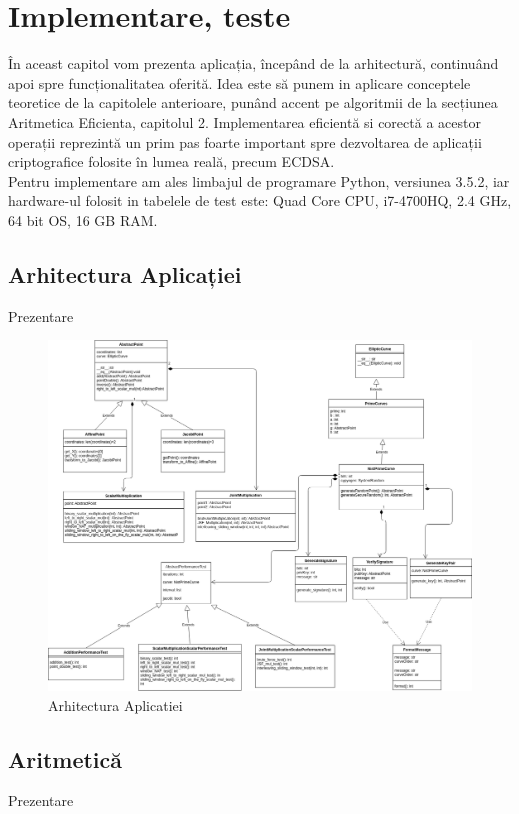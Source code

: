 \chapter{Implementare, teste}

În aceast capitol vom prezenta aplicația, începând de la arhitectură, continuând apoi spre funcționalitatea oferită. Idea este să punem in aplicare conceptele teoretice de la capitolele anterioare, punând accent pe algoritmii de la secțiunea Aritmetica Eficienta, capitolul 2. Implementarea eficientă si corectă a acestor operații reprezintă un prim pas foarte important spre dezvoltarea de aplicații criptografice folosite în lumea reală, precum ECDSA.
\\ Pentru implementare am ales limbajul de programare Python, versiunea 3.5.2, iar hardware-ul folosit in tabelele de test este: Quad Core CPU, i7-4700HQ, 2.4 GHz, 64 bit OS, 16 GB RAM.

\section{Arhitectura Aplicației}
Prezentare

\begin{figure}[htp]
\centering
\includegraphics[width=17.5cm]{chapters/Arhitectura.png}
\caption{Arhitectura Aplicatiei}
\label{fig:lion}
\end{figure}

\section{Aritmetică}
\label{subsec:subsec02}
Prezentare

